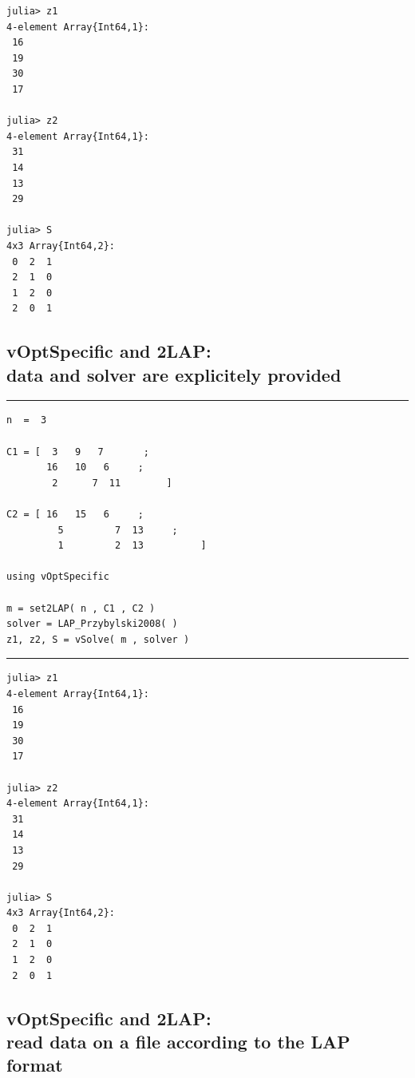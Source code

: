 \documentclass[11pt]{article}
\begin{document}
\begin{verbatim}
julia> z1
4-element Array{Int64,1}:
 16
 19
 30
 17

julia> z2
4-element Array{Int64,1}:
 31
 14
 13
 29

julia> S
4x3 Array{Int64,2}:
 0  2  1
 2  1  0
 1  2  0
 2  0  1
\end{verbatim}

\break

%
%
\subsection{vOptSpecific and 2LAP:\\ data and solver are explicitely provided}

\vspace{5mm}  \vspace{2mm} \hrule

{%
\begin{lstlisting}
n  =  3

C1 = [  3   9   7       ;
       16   10   6     ;
        2      7  11        ]

C2 = [ 16   15   6     ;
         5         7  13     ;
         1         2  13          ]

using vOptSpecific   

m = set2LAP( n , C1 , C2 )
solver = LAP_Przybylski2008( ) 
z1, z2, S = vSolve( m , solver ) 
\end{lstlisting}
}
\vspace{5mm}  \vspace{2mm} \hrule

\begin{verbatim}
julia> z1
4-element Array{Int64,1}:
 16
 19
 30
 17

julia> z2
4-element Array{Int64,1}:
 31
 14
 13
 29

julia> S
4x3 Array{Int64,2}:
 0  2  1
 2  1  0
 1  2  0
 2  0  1
\end{verbatim}

\break

%
%
\subsection{vOptSpecific and 2LAP:\\ read data  on a file according to the LAP format}
\end{document}

